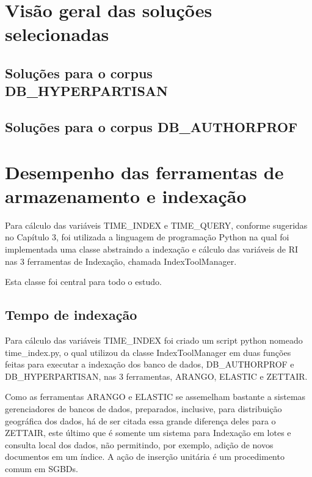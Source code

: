 \section{Visão geral das soluções selecionadas} \label{sec:resex1}
	\subsection{Soluções para o corpus DB\_HYPERPARTISAN}

	\subsection{Soluções para o corpus DB\_AUTHORPROF}

\section{Desempenho das ferramentas de armazenamento e indexação} \label{sec:resex1}
	Para cálculo das variáveis TIME_INDEX e TIME_QUERY, conforme sugeridas no Capítulo 3, foi utilizada a linguagem de programação Python na qual foi implementada uma classe abstraindo a indexação e cálculo das variáveis de RI nas 3 ferramentas de Indexação, chamada IndexToolManager. 

	Esta classe foi central para todo o estudo. 

	\subsection{Tempo de indexação}
		Para cálculo das variáveis TIME_INDEX foi criado um script python nomeado time_index.py, o qual utilizou da classe IndexToolManager em duas funções feitas para executar a indexação dos banco de dados, DB_AUTHORPROF e DB_HYPERPARTISAN, nas 3 ferramentas, ARANGO, ELASTIC e ZETTAIR. 

		

		Como as ferramentas ARANGO e ELASTIC se assemelham bastante a sistemas gerenciadores de bancos de dados, preparados, inclusive, para distribuição geográfica dos dados, há de ser citada essa grande diferença deles para o ZETTAIR, este último que é somente um sistema para Indexação em lotes e consulta local dos dados, não permitindo, por exemplo, adição de novos documentos em um índice. A ação de inserção unitária é um procedimento comum em SGBDs. 

		

